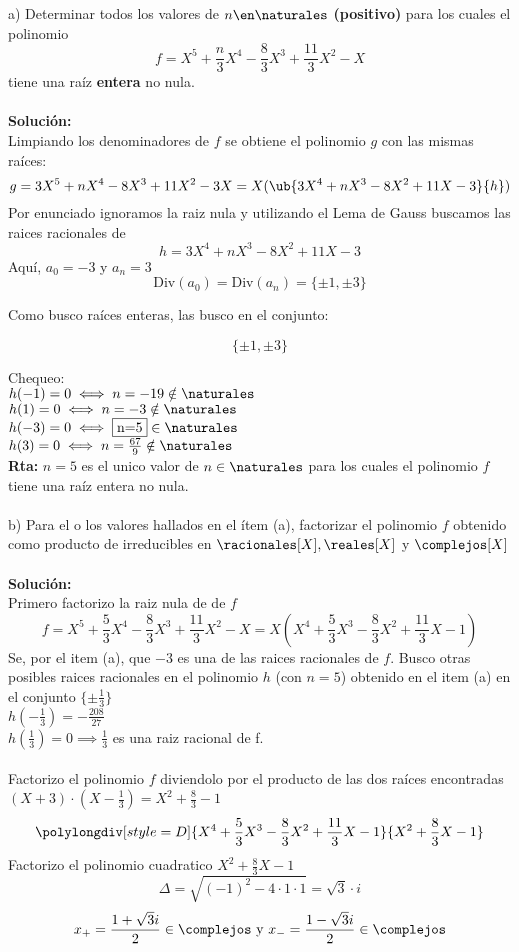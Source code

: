 \ejercicio
a) Determinar todos los valores de $n\en\naturales$ \textbf{(positivo)} para los cuales el polinomio
$$
f=X^5 + \frac{n}{3}X^4 - \frac{8}{3}X^3 + \frac{11}{3}X^2 - X
$$
tiene una raíz \textbf{entera} no nula. 
\\
\\
\textbf{Solución:}
\\
Limpiando los denominadores de $f$ se obtiene el polinomio $g$ con las mismas raíces:
$$
g=3X^5 + nX^4 - 8X^3 + 11X^2 - 3X= X(\ub{3X^4 + nX^3 - 8X^2 + 11X - 3}{h})
$$
Por enunciado ignoramos la raiz nula y utilizando el Lema de Gauss buscamos las raices racionales de
$$
h=3X^4 + nX^3 - 8X^2 + 11X - 3
$$
Aquí, $a_0=-3$ y $a_n=3$
\\
$$
\text{Div}(a_0)=\text{Div}(a_n)=\{\pm1,\pm3\}
$$

Como busco raíces enteras, las busco en el conjunto:

$$
\{ \pm1,\pm3 \}
$$

Chequeo:\\
$h(-1)=0 \iff n=-19\notin\naturales$ \\
$h(1)=0 \iff n=-3\notin\naturales$ \\
$h(-3)=0 \iff \fbox{n=5}\in\naturales$ \\
$h(3)=0 \iff n=\frac{67}{9}\notin\naturales$ \\
\textbf{Rta:} $n=5$ es el unico valor de $n\in\naturales$ para los cuales el polinomio $f$ tiene una raíz entera no nula.\\
\\
b) Para el o los valores hallados en el ítem (a), factorizar el polinomio $f$ obtenido como producto de irreducibles en $\racionales[X],\reales[X]$ y $\complejos[X]$ \\
\\
\textbf{Solución:}\\
Primero factorizo la raiz nula de de $f$ \\
$$
f=X^5 + \frac{5}{3}X^4 - \frac{8}{3}X^3 + \frac{11}{3}X^2 - X = 
X(X^4 + \frac{5}{3}X^3 - \frac{8}{3}X^2 + \frac{11}{3}X - 1)
$$
Se, por el item (a), que $-3$ es una de las raices racionales de $f$. Busco otras posibles raices racionales en el polinomio $h$ (con $n=5$) obtenido en el item (a) en el conjunto $\{ \pm\frac{1}{3} \}$ \\
$h(-\frac{1}{3})=-\frac{208}{27}$ \\
$h(\frac{1}{3})=0 \implies \frac{1}{3}$ es una raiz racional de f. \\
\\
Factorizo el polinomio $f$ diviendolo por el producto de las dos raíces encontradas $(X+3)\cdot(X-\frac{1}{3}) = X^2 + \frac{8}{3} - 1$
$$
\polylongdiv[style=D]{X^4 + \frac{5}{3}X^3 - \frac{8}{3}X^2 + \frac{11}{3}X - 1}{X^2 + \frac{8}{3}X - 1}
$$
Factorizo el polinomio cuadratico $X^2 + \frac{8}{3}X - 1$
$$ \Delta = \sqrt{(-1)^2 - 4 \cdot 1 \cdot 1}=\sqrt{3}\cdot i $$
$$ x_+ = \frac{1 + \sqrt 3 i}{2} \in\complejos \text{ y } x_- = \frac{1 - \sqrt 3 i}{2} \in\complejos $$

